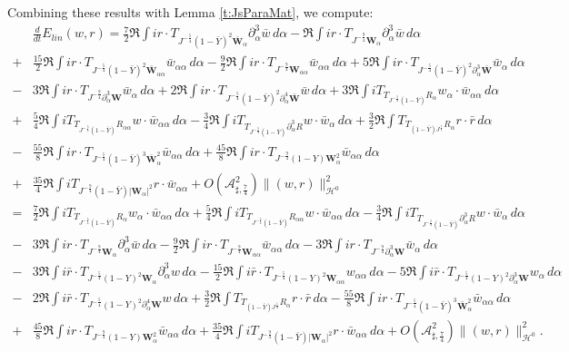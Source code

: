 \documentclass[10pt]{amsart}
\theoremstyle{remark}
\theoremstyle{definition}
\numberwithin{equation}{section}
\newcommand{\p}{\partial}
\renewcommand{\H}{{\mathcal H }}
\newcommand{\al}{\alpha}
\newcommand{\f}{\frac}
\newcommand{\bw}{\mathbf{W}}
\newcommand{\ASSharp}{{\mathcal{A}_{\sharp,\frac{7}{4}}^2}}
\begin{document}
Combining these results with Lemma \ref{t:JsParaMat}, we compute:
\begin{align*}
&\frac{d}{dt} E_{lin}(w,r)=\frac{7}{2}\Re \int ir\cdot T_{J^{-\f54}(1-\bar{Y})^2 \bar{\bw}_\al} \p_\al^3 \bar{w} \,d\al-\Re \int ir \cdot T_{J^{-\f94}\bw_\al}  \p_\al^3 \bar{w} \,d\al \\
+& \frac{15}{2}\Re \int ir\cdot T_{J^{-\f54}(1-\bar{Y})^2\bar{\bw}_{\al \al}}\bar{w}_{\al \al}\,d\al-\f92\Re \int ir \cdot T_{J^{-\f94}\bw_{\al \al}} \bar{w}_{\al \al} \,d\al +5 \Re \int ir \cdot T_{J^{-\f54}(1-\bar{Y})^2 \p_\al^3 \bar{\bw}}\bar{w}_\al \,d\al\\
-& 3\Re \int ir \cdot T_{J^{-\f94}\p_\al^3 \bw} \bar{w}_{\al} \,d\al +2 \Re \int ir \cdot T_{J^{-\f54}(1-\bar{Y})^2 \p_\al^4 \bar{\bw}}\bar{w} \,d\al  + 3\Re \int i T_{T_{J^{-\f54}(1-\bar{Y})}R_{\al}}w_\al \cdot \bar{w}_{\al \al} \,d\al \\
+& \f54\Re \int i T_{T_{J^{-\f54}(1-\bar{Y})}R_{\al\al}}w \cdot \bar{w}_{\al \al} \,d\al-\f34\Re \int i T_{T_{J^{-\f54}(1-\bar{Y})}\partial_\al^3 R}w \cdot \bar{w}_{\al } \,d\al  + \f32\Re \int T_{T_{(1-\bar{Y})J^{\f14}}R_\al} r\cdot \bar{r} \,d\al\\
-& \f{55}{8}\Re \int ir \cdot T_{J^{-\f54}(1-\bar{Y})^3 \bar{\bw}_\al^2} \bar{w}_{\al \al} \,d\al  +\f{45}{8}\Re \int ir \cdot T_{J^{-\f94}(1-Y)\bw_\al^2} \bar{w}_{\al \al} \,d\al\\
 +& \frac{35}{4}\Re \int i T_{J^{-\f94}(1-\bar{Y})|\bw_\al|^2}r \cdot \bar{w}_{\al \al}+  O\left(\ASSharp \right) \|(w,r)\|_{\H^0}^2\\
 =&\frac{7}{2}\Re \int i T_{T_{J^{-\f54}(1-\bar{Y})}R_{\al}}w_\al \cdot \bar{w}_{\al \al} \,d\al +\f54 \Re \int i T_{T_{J^{-\f54}(1-\bar{Y})}R_{\al\al}}w \cdot \bar{w}_{\al \al} \,d\al-\f34\Re \int i T_{T_{J^{-\f54}(1-\bar{Y})}\partial_\al^3 R}w \cdot \bar{w}_{\al } \,d\al\\
 -&3\Re \int ir \cdot T_{J^{-\f94}\bw_\al}  \p_\al^3 \bar{w} \,d\al-\f92\Re \int ir \cdot T_{J^{-\f94}\bw_{\al \al}} \bar{w}_{\al \al} \,d\al- 3\Re \int ir \cdot T_{J^{-\f94}\p_\al^3 \bw} \bar{w}_{\al} \,d\al\\
-&3\Re \int i\bar{r}\cdot T_{J^{-\f54}(1-Y)^2 \bw_\al} \p_\al^3 w \,d\al -\frac{15}{2}\Re \int i\bar{r}\cdot T_{J^{-\f54}(1-Y)^2\bw_{\al \al}}w_{\al \al}\,d\al- 5 \Re \int i\bar{r} \cdot T_{J^{-\f54}(1-Y)^2 \p_\al^3 \bw}w_\al \,d\al \\
-&2 \Re \int i\bar{r} \cdot T_{J^{-\f54}(1-Y)^2 \p_\al^4\bw}w\,d\al +\f32\Re \int T_{T_{(1-\bar{Y})J^{\f14}}R_\al} r\cdot \bar{r} \,d\al - \f{55}{8}\Re \int ir \cdot T_{J^{-\f54}(1-\bar{Y})^3 \bar{\bw}_\al^2} \bar{w}_{\al \al} \,d\al  \\
 +&\f{45}{8}\Re \int ir \cdot T_{J^{-\f94}(1-Y)\bw_\al^2} \bar{w}_{\al \al} \,d\al
 + \frac{35}{4}\Re \int i T_{J^{-\f94}(1-\bar{Y})|\bw_\al|^2}r \cdot \bar{w}_{\al \al}\,d\al+  O\left(\ASSharp \right) \|(w,r)\|_{\H^0}^2.
\end{align*}
\end{document}
